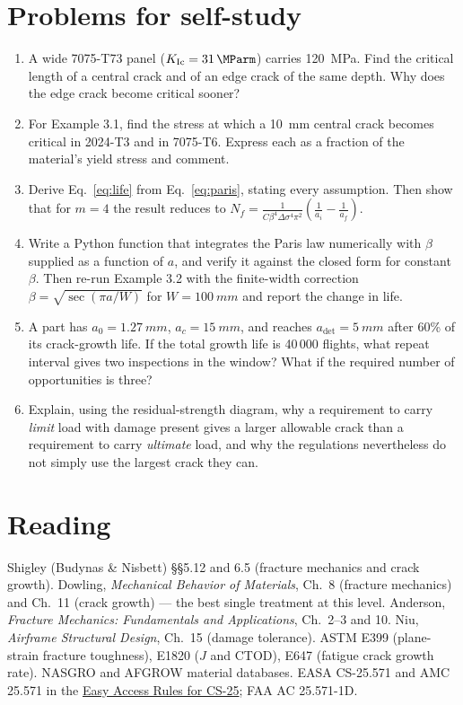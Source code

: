 \documentclass[11pt,a4paper]{article}
\begin{document}
\section{Problems for self-study}
\begin{enumerate}[nosep]
  \item A wide 7075-T73 panel ($K_{\mathrm{Ic}}=\SI{31}{\MParm}$) carries \SI{120}{MPa}. Find the critical length of a central crack and of an edge crack of the same depth. Why does the edge crack become critical sooner?
  \item For Example 3.1, find the stress at which a \SI{10}{mm} central crack becomes critical in 2024-T3 and in 7075-T6. Express each as a fraction of the material's yield stress and comment.
  \item Derive Eq.~\eqref{eq:life} from Eq.~\eqref{eq:paris}, stating every assumption. Then show that for $m=4$ the result reduces to $N_f=\frac{1}{C\beta^4\Delta\sigma^4\pi^2}\left(\frac{1}{a_i}-\frac{1}{a_f}\right)$.
  \item Write a Python function that integrates the Paris law numerically with $\beta$ supplied as a function of $a$, and verify it against the closed form for constant $\beta$. Then re-run Example 3.2 with the finite-width correction $\beta=\sqrt{\sec(\pi a/W)}$ for $W=\SI{100}{mm}$ and report the change in life.
  \item A part has $a_0=\SI{1.27}{mm}$, $a_c=\SI{15}{mm}$, and reaches $a_{\mathrm{det}}=\SI{5}{mm}$ after 60\% of its crack-growth life. If the total growth life is 40\,000 flights, what repeat interval gives two inspections in the window? What if the required number of opportunities is three?
  \item Explain, using the residual-strength diagram, why a requirement to carry \emph{limit} load with damage present gives a larger allowable crack than a requirement to carry \emph{ultimate} load, and why the regulations nevertheless do not simply use the largest crack they can.
\end{enumerate}

\section*{Reading}
Shigley (Budynas \& Nisbett) \S\S5.12 and 6.5 (fracture mechanics and crack growth). Dowling, \emph{Mechanical Behavior of Materials}, Ch.\ 8 (fracture mechanics) and Ch.\ 11 (crack growth) --- the best single treatment at this level. Anderson, \emph{Fracture Mechanics: Fundamentals and Applications}, Ch.\ 2--3 and 10. Niu, \emph{Airframe Structural Design}, Ch.\ 15 (damage tolerance). ASTM E399 (plane-strain fracture toughness), E1820 ($J$ and CTOD), E647 (fatigue crack growth rate). NASGRO and AFGROW material databases. EASA CS-25.571 and AMC 25.571 in the \href{https://www.easa.europa.eu/en/document-library/easy-access-rules/online-publications/easy-access-rules-large-aeroplanes-cs-25}{Easy Access Rules for CS-25}; FAA AC 25.571-1D.
\end{document}
